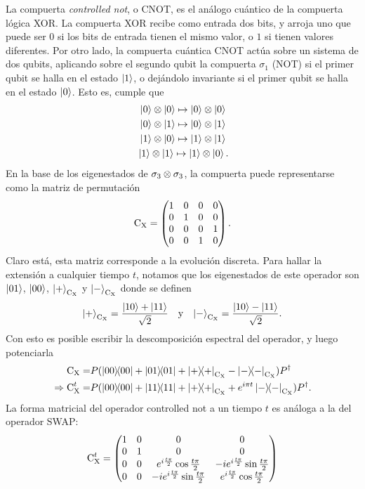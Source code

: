 La compuerta \textit{controlled not}, o CNOT, es el análogo cuántico de la compuerta lógica XOR. La compuerta XOR recibe como entrada dos bits, y arroja uno que puede ser $0$ si los bits de entrada tienen el mismo valor, o $1$ si tienen valores diferentes. Por otro lado, la compuerta cuántica CNOT actúa sobre un sistema de dos qubits, aplicando sobre el segundo qubit la compuerta $\sigma_{1}$ (NOT) si el primer qubit se halla en el estado $\ket{1}$, o dejándolo invariante si el primer qubit se halla en el estado $\ket{0}$. Esto es, cumple que \cite{Chuang}
\begin{align*}
    \ket{0}\otimes\ket{0}\mapsto\ket{0}\otimes\ket{0}\\
    \ket{0}\otimes\ket{1}\mapsto\ket{0}\otimes\ket{1}\\
    \ket{1}\otimes\ket{0}\mapsto\ket{1}\otimes\ket{1}\\
    \ket{1}\otimes\ket{1}\mapsto\ket{1}\otimes\ket{0} \rlap{.}
\end{align*}
En la base de los eigenestados de $\sigma_{3}\otimes\sigma_{3}$, la compuerta puede representarse como la matriz de permutación
\begin{equation*}
    \text{C}_{\text{X}}=\begin{pmatrix}
        1&0&0&0\\
        0&1&0&0\\
        0&0&0&1\\
        0&0&1&0
    \end{pmatrix}.
\end{equation*}
Claro está, esta matriz corresponde a la evolución discreta. Para hallar la extensión a cualquier tiempo $t$, notamos que los eigenestados de este operador son $\ket{01}$, $\ket{00}$, $\ket{+}_{\text{C}_{\text{X}}}$ y $\ket{-}_{\text{C}_{\text{X}}}$ donde se definen
\begin{align*}
  \ket{+}_{\text{C}_{\text{X}}}=\frac{\ket{10}+\ket{11}}{\sqrt{2}} & & \text{y} & & \ket{-}_{\text{C}_{\text{X}}}=\frac{\ket{10}-\ket{11}}{\sqrt{2}}.
\end{align*}
Con esto es posible escribir la descomposición espectral del operador, y luego potenciarla 
\begin{align*}
\cnot=&P(\dyad{00}+\dyad{01}+\dyad{+}_{\cnot}-\dyad{-}_{\cnot})P^{\dag}\\
\Rightarrow \cnot^{t}=&P(\dyad{00}+\dyad{11}+\dyad{+}_{\cnot}+e^{i \pi t}\dyad{-}_{\cnot})P^{\dag}.
\end{align*}
La forma matricial del operador controlled not a un tiempo $t$ es análoga a la del operador SWAP:
\begin{equation}\label{eq:CNOT(t)}
\text{C}_{\text{X}}^{t}=\begin{pmatrix}
  1 & 0 & 0 & 0 \\
  0 & 1 & 0 & 0 \\
  0 & 0 & e^{i\frac{t\pi}{2}}\cos{\frac{t\pi}{2}} & -ie^{i\frac{t\pi}{2}}\sin{\frac{t\pi}{2}}\\
  0 & 0 & -ie^{i\frac{t\pi}{2}}\sin{\frac{t\pi}{2}} & e^{i\frac{t\pi}{2}}\cos{\frac{t\pi}{2}}
 \end{pmatrix}
\end{equation}

